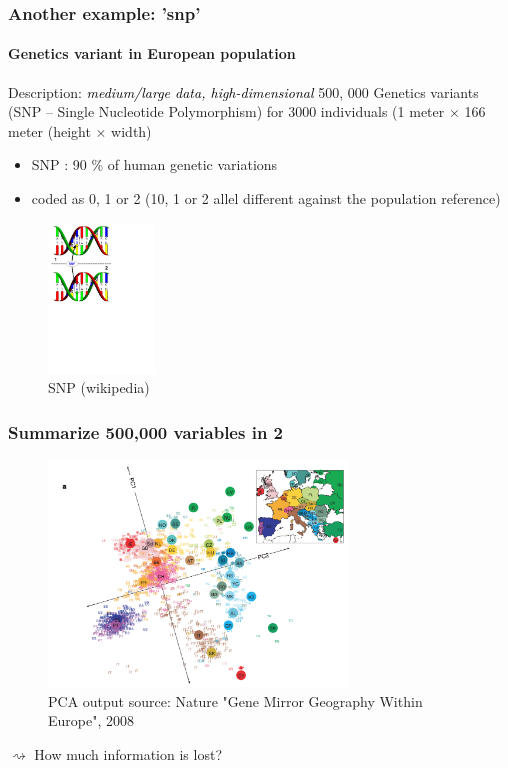 \documentclass{beamer}\usepackage[]{graphicx}\usepackage[]{color}
\begin{document}
\begin{frame}[fragile]
  \frametitle{Another example: 'snp'}
  \framesubtitle{Genetics variant in European population}

\begin{block}{Description: \textcolor{black}{\it medium/large data, high-dimensional}}
500, 000 Genetics variants (SNP -- Single Nucleotide Polymorphism) for  3000 individuals
(1 meter $\times$ 166 meter (height $\times$ width)
\end{block}

\begin{multicols}{2}
  \begin{itemize}
  \item SNP : 90 \% of human genetic variations
  \item coded as 0, 1 or 2 (10, 1 or 2 allel different against the population reference)
  \end{itemize}

  \begin{figure}
    \centering
     \includegraphics[height=4cm]{SNP}   
    \caption{SNP (wikipedia)}
  \end{figure}
\end{multicols}

\end{frame}

\begin{frame}
  \frametitle{Summarize 500,000 variables in 2}

  \begin{figure}
    \centering
      \includegraphics[height=6cm]{geneMirrorGeography}
    \caption{PCA output {\tiny source: Nature "Gene  Mirror Geography Within  Europe", 2008}}
  \end{figure}

  $\rightsquigarrow$ How much information is lost?

\end{frame}
\end{document}
